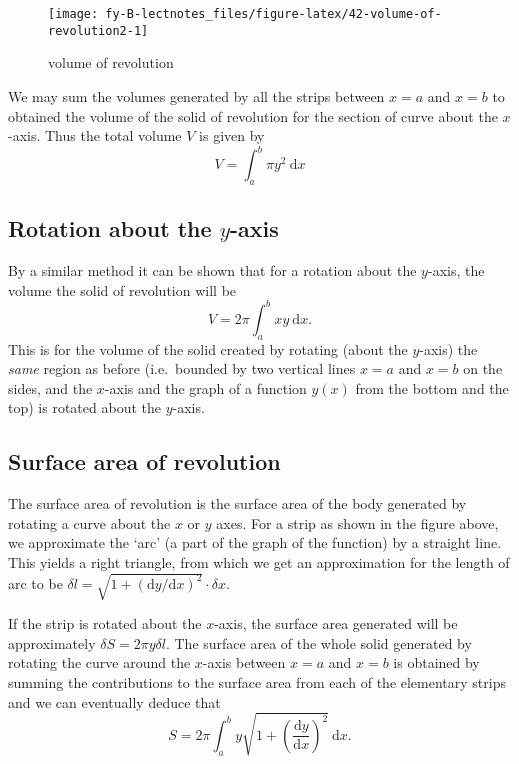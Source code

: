 \documentclass[
  english,
  11pt,
  oneside]{book}
\newcommand{\slide}{}
\theoremstyle{definition}
\theoremstyle{definition}
\theoremstyle{definition}
\theoremstyle{definition}
\theoremstyle{remark}
\begin{document}
\begin{figure}

{\centering \texttt{[image: fy-B-lectnotes\_files/figure-latex/42-volume-of-revolution2-1]} 

}

\caption{volume of revolution}\label{fig:42-volume-of-revolution2}
\end{figure}

We may sum the volumes generated by all the strips between \(x = a\) and \(x = b\) to obtained the volume of the solid of revolution for the section of curve about the \(x\)-axis.
Thus the total volume \(V\) is given by
\[
V = \int_a^b\pi y^2\ \mathrm{d}x
\]
\slide

\subsection{\texorpdfstring{Rotation about the \(y\)-axis}{Rotation about the y-axis}}\label{rotation-about-the-y-axis}

By a similar method it can be shown that for a rotation about the \(y\)-axis, the volume the solid of revolution will be
\[
V = 2\pi\int_a^bxy\ \mathrm{d}x.
\]
This is for the volume of the solid created by rotating (about the \(y\)-axis) the \emph{same} region as before (i.e.~bounded by two vertical lines \(x=a\) and \(x=b\) on the sides, and the \(x\)-axis and the graph of a function \(y(x)\) from the bottom and the top) is rotated about the \(y\)-axis.
\slide

\subsection{Surface area of revolution}\label{surface-area-of-revolution}

The surface area of revolution is the surface area of the body generated by rotating a curve about the \(x\) or \(y\) axes. For a strip as shown in the figure above, we approximate the `arc' (a part of the graph of the function) by a straight line. This yields a right triangle, from which we get an approximation for the length of arc to be \(\delta l=\sqrt{1+(\mathrm{d}y/\mathrm{d}x)^2}\cdot\delta x\).

\slide

If the strip is rotated about the \(x\)-axis, the surface area generated will be approximately \(\delta S = 2\pi y\delta l\). The surface area of the whole solid generated by rotating the curve around the \(x\)-axis between \(x = a\) and \(x = b\) is obtained by summing the contributions to the surface area from each of the elementary strips and we can eventually deduce that
\[
S = 2\pi\int_a^b y\sqrt{1+\left(\frac{\mathrm{d}y}{\mathrm{d}x}\right)^2}\ \mathrm{d}x.
\]
\slide
\end{document}
